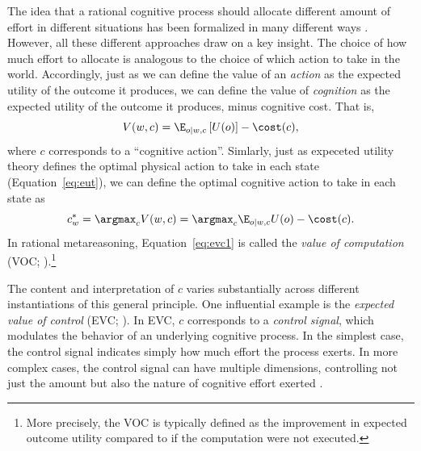 
The idea that a rational cognitive process should allocate different amount of effort in different situations has been formalized in many different ways \citep{shenhav2013expected,anderson1990adaptive,lieder2017strategy}. However, all these different approaches draw on a key insight. The choice of how much effort to allocate is analogous to the choice of which action to take in the world. Accordingly, just as we can define the value of an \emph{action} as the expected utility of the outcome it produces, we can define the value of \emph{cognition} as the expected utility of the outcome it produces, minus cognitive cost. That is,
\begin{equation}\label{eq:evc1}
  V(w, c) = 
    \E_{o \mid w, c} \left[
      U(o)
    \right] - \cost(c),
\end{equation}
where $c$ corresponds to a ``cognitive action''. Simlarly, just as expeceted utility theory defines the optimal physical action to take in each state (Equation~\ref{eq:eut}), we can define the optimal cognitive action to take in each state as
\begin{equation}\label{eq:evc2}
  c^*_w = \argmax_c V(w, c) = \argmax_c \E_{o \mid w, c} U(o) - \cost(c).
\end{equation}
In rational metareasoning, Equation~\ref{eq:evc1} is called the \emph{value of computation} (VOC; \citealp{russell1991principles}).\footnote{%
  More precisely, the VOC is typically defined as the improvement in expected outcome utility compared to if the computation were not executed.}

The content and interpretation of $c$ varies substantially across different instantiations of this general principle. One influential example is the \emph{expected value of control} (EVC; \citealp{shenhav2013expected}). In EVC, $c$ corresponds to a \emph{control signal}, which modulates the behavior of an underlying cognitive process. In the simplest case, the control signal indicates simply how much effort the process exerts. In more complex cases, the control signal can have multiple dimensions, controlling not just the amount but also the nature of cognitive effort exerted \citep{musslick2015computational,grahek2020computational,ritz2021cognitive}.

